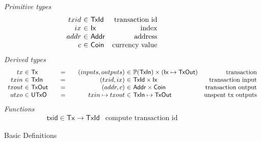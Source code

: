 \documentclass[11pt,a4paper]{article}
\begin{document}
\begin{figure}[h]

\emph{Primitive types}
%
\begin{equation*}
\begin{array}{r@{~\in~}lr}
  txid
& \mathsf{TxId}
& \text{transaction id}
\\
  ix
& \mathsf{Ix}
& \text{index}
\\
  addr
& \mathsf{Addr}
& \text{address}
\\
  c
& \mathsf{Coin}
& \text{currency value}
\end{array}
\end{equation*}
%
\emph{Derived types}
%
\begin{equation*}
\begin{array}{r@{~\in~}l@{\qquad=\qquad}r@{~\in~}lr}
  tx
& \mathsf{Tx}
& (inputs, outputs)
& \powerset{\mathsf{TxIn}} \times (\mathsf{Ix} \mapsto \mathsf{TxOut})
& \text{transaction}
\\
  txin
& \mathsf{TxIn}
& (txid, ix)
& \mathsf{TxId} \times \mathsf{Ix}
& \text{transaction input}
\\
  txout
& \mathsf{TxOut}
& (addr, c)
& \mathsf{Addr} \times \mathsf{Coin}
& \text{transaction output}
\\
  utxo
& \mathsf{UTxO}
& txin \mapsto txout
& \mathsf{TxIn} \mapsto \mathsf{TxOut}
& \text{unspent tx outputs}
\end{array}
\end{equation*}
%
\emph{Functions}
%
\begin{equation*}
\begin{array}{lr}
  \mathsf{txid} \in \mathsf{Tx} \to \mathsf{TxId}
& \text{compute transaction id}
\end{array}
\end{equation*}

\caption{\label{fig:basic_definitions}Basic Definitions}
\end{figure}
\end{document}

